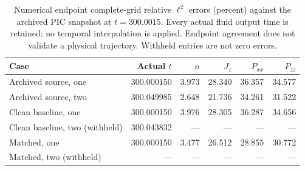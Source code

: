 \begin{table}[tbp]
\centering\small
\caption{Numerical endpoint complete-grid relative $\ell^2$ errors (percent) against the archived PIC snapshot at $t=300.0015$. Every actual fluid output time is retained; no temporal interpolation is applied. Endpoint agreement does not validate a physical trajectory. Withheld entries are not zero errors.}
\label{tab:control-errors}
\begin{tabular}{lrrrrr}
\toprule
Case & Actual $t$ & $n$ & $J_z$ & $P_{xx}$ & $P_{zz}$ \\
\midrule
Archived source, one & 300.000150 & 3.973 & 28.340 & 36.357 & 34.577 \\
Archived source, two & 300.049985 & 2.648 & 21.736 & 34.261 & 31.522 \\
Clean baseline, one & 300.000150 & 3.976 & 28.305 & 36.287 & 34.656 \\
Clean baseline, two (withheld) & 300.043832 & --- & --- & --- & --- \\
Matched, one & 300.000150 & 3.477 & 26.512 & 28.855 & 30.772 \\
Matched, two (withheld) & --- & --- & --- & --- & --- \\
\bottomrule
\end{tabular}
\end{table}
